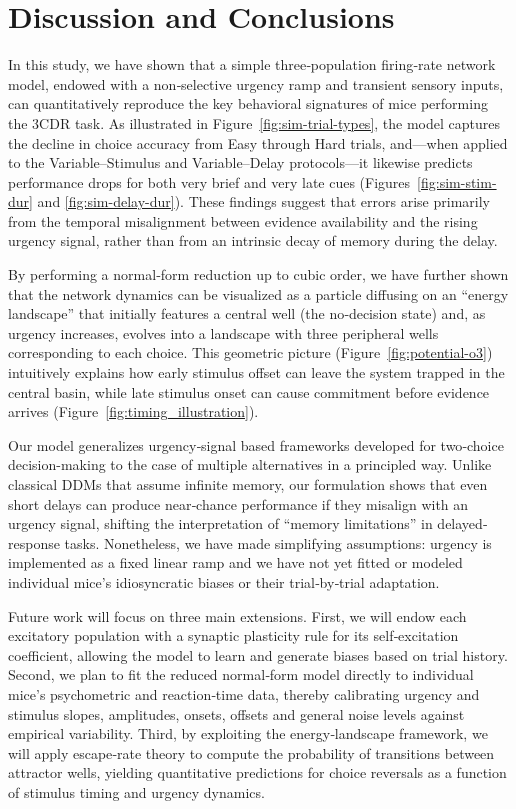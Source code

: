 \section{Discussion and Conclusions}

In this study, we have shown that a simple three‐population firing‐rate network model, endowed with a non‐selective urgency ramp and transient sensory inputs, can quantitatively reproduce the key behavioral signatures of mice performing the 3CDR task. As illustrated in Figure~\ref{fig:sim-trial-types}, the model captures the decline in choice accuracy from Easy through Hard trials, and—when applied to the Variable–Stimulus and Variable–Delay protocols—it likewise predicts performance drops for both very brief and very late cues (Figures~\ref{fig:sim-stim-dur} and \ref{fig:sim-delay-dur}). These findings suggest that errors arise primarily from the temporal misalignment between evidence availability and the rising urgency signal, rather than from an intrinsic decay of memory during the delay.

By performing a normal‐form reduction up to cubic order, we have further shown that the network dynamics can be visualized as a particle diffusing on an “energy landscape” that initially features a central well (the no‐decision state) and, as urgency increases, evolves into a landscape with three peripheral wells corresponding to each choice. This geometric picture (Figure~\ref{fig:potential-o3}) intuitively explains how early stimulus offset can leave the system trapped in the central basin, while late stimulus onset can cause commitment before evidence arrives (Figure~\ref{fig:timing_illustration}).

Our model generalizes urgency‐signal based frameworks developed for two‐choice decision-making \cite{inagaki2019} to the case of multiple alternatives in a principled way. Unlike classical DDMs that assume infinite memory, our formulation shows that even short delays can produce near‐chance performance if they misalign with an urgency signal, shifting the interpretation of “memory limitations” in delayed‐response tasks. Nonetheless, we have made simplifying assumptions: urgency is implemented as a fixed linear ramp and we have not yet fitted or modeled individual mice’s idiosyncratic biases or their trial‐by‐trial adaptation.

Future work will focus on three main extensions. First, we will endow each excitatory population with a synaptic plasticity rule for its self‐excitation coefficient, allowing the model to learn and generate biases based on trial history. Second, we plan to fit the reduced normal‐form model directly to individual mice’s psychometric and reaction‐time data, thereby calibrating urgency and stimulus slopes, amplitudes, onsets, offsets and general noise levels against empirical variability. Third, by exploiting the energy‐landscape framework, we will apply escape‐rate theory to compute the probability of transitions between attractor wells, yielding quantitative predictions for choice reversals as a function of stimulus timing and urgency dynamics.

